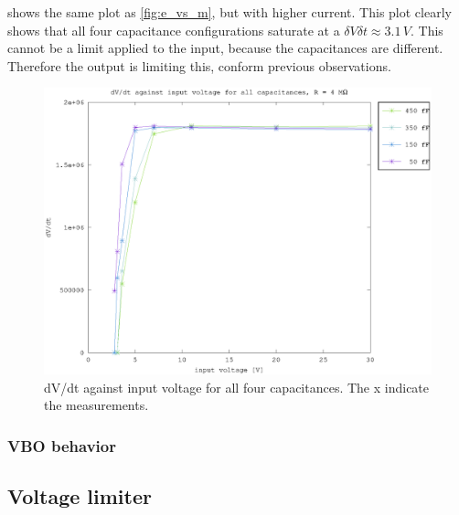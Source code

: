 shows the same plot as \cref{fig:e_vs_m}, but with higher current. This plot clearly shows that all four capacitance configurations saturate at a $\delta V\delta t \approx 3.1\,V$. This cannot be a limit applied to the input, because the capacitances are different. Therefore the output is limiting this, conform previous observations.

\begin{figure}[h]
    \centering
    \includegraphics[width=\textwidth]{fig/bre_vin_vs_time_sat.eps}
    \caption {dV/dt against input voltage for all four capacitances. The x indicate the measurements.}    
    \label{fig:bre_e_vs_m}
\end{figure}

\clearpage
\subsubsection{VBO behavior}\label{sssec:VBO_behavior}


\subsection{Voltage limiter}\label{ssec:dynamic_voltage_limiter}


